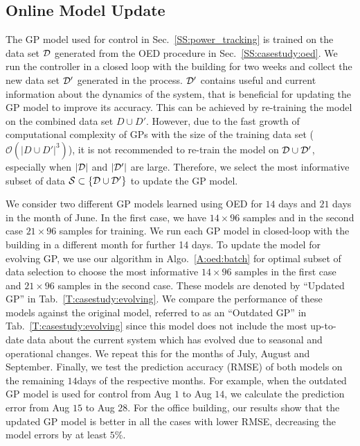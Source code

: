 \subsection{Online Model Update}
\label{SS:casestudy:active}

The GP model used for control in Sec.~\ref{SS:power_tracking} is trained on the data set \(\mathcal{D}\) generated from the OED procedure in Sec.~\ref{SS:casestudy:oed}.
We run the controller in a closed loop with the building for two weeks and collect the new data set \(\mathcal{D}'\) generated in the process.
\(\mathcal{D}'\) contains useful and current information about the dynamics of the system, %
that is beneficial for updating the GP model to improve its accuracy.
This can be achieved by re-training the model on the combined data set $D \cup D'$.
However, due to the fast growth of computational complexity of GPs with the size of the training data set (\(\mathcal{O}(|D \cup D'|^3)\)), it is not recommended to re-train the model on \(\mathcal{D} \cup \mathcal{D}'\), especially when \(|\mathcal{D}|\)  and \(|\mathcal{D}'|\) are large.
Therefore, we select the most informative subset of data \(\mathcal{S} \subset \{\mathcal{D} \cup \mathcal{D}' \} \) to update the GP model.


We consider two different GP models learned using OED for \(14\) days and \(21\) days in the month of June. 
In the first case, we have \(14\times96\) samples and in the second case \(21\times96\) samples for training.
We run each GP model in closed-loop with the building in a different month for further 14 days.
To update the model for evolving GP, we use our algorithm in Algo.~\ref{A:oed:batch} for optimal subset of data selection to choose the most informative \(14\times96\) samples in the first case and \(21\times96\) samples in the second case. 
These models are denoted by ``Updated GP'' in Tab.~\ref{T:casestudy:evolving}. 
We compare the performance of these models against the original model, referred to as an ``Outdated GP'' in Tab.~\ref{T:casestudy:evolving} since this model does not include the most up-to-date data about the current system which has evolved due to seasonal and operational changes.
We repeat this for the months of July, August and September.
Finally, we test the prediction accuracy (RMSE) of both models on the remaining \(14 \)days of the respective months. 
For example, when the outdated GP model is used for control from Aug \(1\) to Aug \(14\), we calculate the prediction error from Aug \(15\) to Aug \(28\). 
For the office building, our results show that the updated GP model is better in all the cases with lower RMSE, decreasing the model errors by at least \(5\%\).



